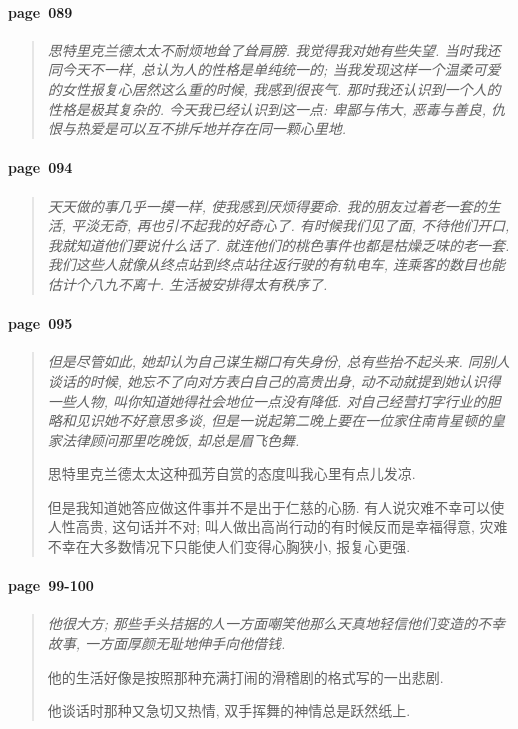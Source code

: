 \paragraph*{page~089}
\begin{quotation}
    \itshape
    思特里克兰德太太不耐烦地耸了耸肩膀. 我觉得我对她有些失望. 当时我还同今天不一样, 总认为人的性格是单纯统一的; 当我发现这样一个温柔可爱的女性报复心居然这么重的时候, 我感到很丧气. 那时我还认识到一个人的性格是极其复杂的. 今天我已经认识到这一点: 卑鄙与伟大, 恶毒与善良, 仇恨与热爱是可以互不排斥地并存在同一颗心里地. 
\end{quotation}

\paragraph*{page~094}
\begin{quotation}
    \itshape
    天天做的事几乎一摸一样, 使我感到厌烦得要命. 我的朋友过着老一套的生活, 平淡无奇, 再也引不起我的好奇心了. 有时候我们见了面, 不待他们开口, 我就知道他们要说什么话了. 就连他们的桃色事件也都是枯燥乏味的老一套. 我们这些人就像从终点站到终点站往返行驶的有轨电车, 连乘客的数目也能估计个八九不离十. 生活被安排得太有秩序了. 
\end{quotation}

\paragraph*{page~095}
\begin{quotation}
    \itshape
    但是尽管如此, 她却认为自己谋生糊口有失身份, 总有些抬不起头来. 同别人谈话的时候, 她忘不了向对方表白自己的高贵出身, 动不动就提到她认识得一些人物, 叫你知道她得社会地位一点没有降低. 对自己经营打字行业的胆略和见识她不好意思多谈, 但是一说起第二晚上要在一位家住南肯星顿的皇家法律顾问那里吃晚饭, 却总是眉飞色舞. 

    思特里克兰德太太这种孤芳自赏的态度叫我心里有点儿发凉. 

    但是我知道她答应做这件事并不是出于仁慈的心肠. 有人说灾难不幸可以使人性高贵, 这句话并不对; 叫人做出高尚行动的有时候反而是幸福得意, 灾难不幸在大多数情况下只能使人们变得心胸狭小, 报复心更强. 
\end{quotation}

\paragraph*{page~99-100}
\begin{quotation}
    \itshape
    他很大方; 那些手头拮据的人一方面嘲笑他那么天真地轻信他们变造的不幸故事, 一方面厚颜无耻地伸手向他借钱. 

    他的生活好像是按照那种充满打闹的滑稽剧的格式写的一出悲剧. 

    他谈话时那种又急切又热情, 双手挥舞的神情总是跃然纸上. 
\end{quotation}



